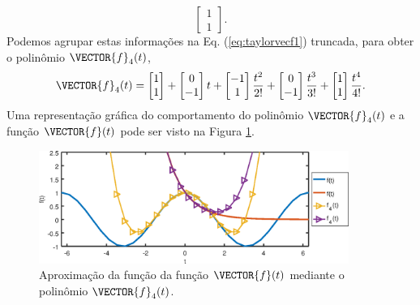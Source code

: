 \begin{SolutionT}
\begin{equation}
\begin{bmatrix}
1\\
1
\end{bmatrix}.
\end{equation}
Podemos agrupar estas informações na Eq. (\ref{eq:taylorvecf1}) truncada, 
para obter o polinômio $\VECTOR{f}_{4}(t)$,
\begin{equation}
\VECTOR{f}_{4}(t)=
\begin{bmatrix}
1\\
1
\end{bmatrix}
+
\begin{bmatrix}
0\\
-1
\end{bmatrix}
t
+
\begin{bmatrix}
-1\\
1
\end{bmatrix}
\frac{t^{2}}{2!}
+
\begin{bmatrix}
0\\
-1
\end{bmatrix}
\frac{t^{3}}{3!}
+
\begin{bmatrix}
1\\
1
\end{bmatrix}
\frac{t^{4}}{4!}.
\end{equation}
Uma representação gráfica do comportamento do polinômio $\VECTOR{f}_{4}(t)$ e a função $\VECTOR{f}(t)$
pode ser visto na Figura \ref{fig:taylorvecf}.
\end{SolutionT}

\begin{figure}[!h]
  \centering
    \includegraphics[width=0.90\textwidth]{chapters/funcoes/mcode/taylorR1R2/taylore.eps}
  \caption{Aproximação da função da função $\VECTOR{f}(t)$ mediante o polinômio $\VECTOR{f}_{4}(t)$.}
    \label{fig:taylorvecf}
\end{figure}

